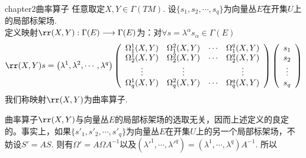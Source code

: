 \begin{mydef}{}{chapter2曲率算子}
	任意取定$X,Y\in \Gamma(TM)$. 设$\{s_{1},s_{2},\cdots ,s_{q} \}$为向量丛$E$在开集$U$上的局部标架场. \\
	定义映射$\rr(X,Y):\Gamma(E)\longrightarrow \Gamma(E)$为：对$\forall s=\lambda^{\alpha}s_{\alpha}\in \Gamma(E)$
	\[
	\rr(X,Y)s=\left(\lambda^{1},\lambda^{2},\cdots,\lambda^{q} \right)\left( \begin{array}{cccc}{\Omega^{1}_{1}(X,Y)} & {\Omega^{2}_{1}(X,Y)}&{\cdots}&{\Omega^{q}_{1}(X,Y)}\\ {\Omega^{1}_{2}(X,Y)} & {\Omega^{2}_{2}(X,Y)}&{\cdots}&{\Omega^{q}_{2}(X,Y)}\\ {\vdots} & {\vdots}&{ }&{\vdots}\\{\Omega^{1}_{q}(X,Y)} & {\Omega^{2}_{q}(X,Y)}&{\cdots}&{\Omega^{q}_{q}(X,Y)}\\ \end{array}\right)\left( \begin{array}{cccc}{s_{1}} \\{s_{2}}\\ {\vdots}  \\ {s_{q}} \end{array}\right)
	\]
	我们称映射$\rr(X,Y)$为曲率算子.
\end{mydef}
曲率算子$\rr(X,Y)$与向量丛$E$的局部标架场的选取无关，因而上述定义的良定的。事实上，如果$\{s'_{1},s'_{2},\cdots ,s'_{q} \}$为向量丛$E$在开集$U$上的另一个局部标架场，不妨设$S'=A  S$. 则有$\Omega'=A  \Omega  A^{-1}$以及$\left(\lambda'^{1},\cdots,\lambda'^{q} \right)=\left(\lambda^{1},\cdots,\lambda^{q} \right) A^{-1}$. 所以
